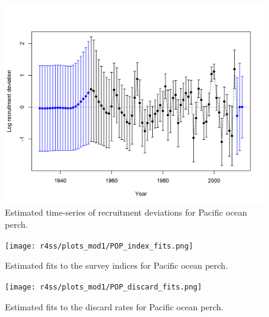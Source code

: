 \documentclass[12pt,]{article}
\begin{document}
\begin{figure}
\centering
\includegraphics{r4ss/plots_mod1/recdevs2_withbars.png}
\caption{Estimated time-series of recruitment deviations for Pacific
ocean perch. \label{fig:recdevs}}
\end{figure}

\FloatBarrier

\begin{figure}
\centering
\texttt{[image: r4ss/plots\_mod1/POP\_index\_fits.png]}
\caption{Estimated fits to the survey indices for Pacific ocean perch.
\label{fig:index_fits}}
\end{figure}

\FloatBarrier 

\begin{figure}
\centering
\texttt{[image: r4ss/plots\_mod1/POP\_discard\_fits.png]}
\caption{Estimated fits to the discard rates for Pacific ocean perch.
\label{fig:discard_fits}}
\end{figure}

\FloatBarrier 
\end{document}
